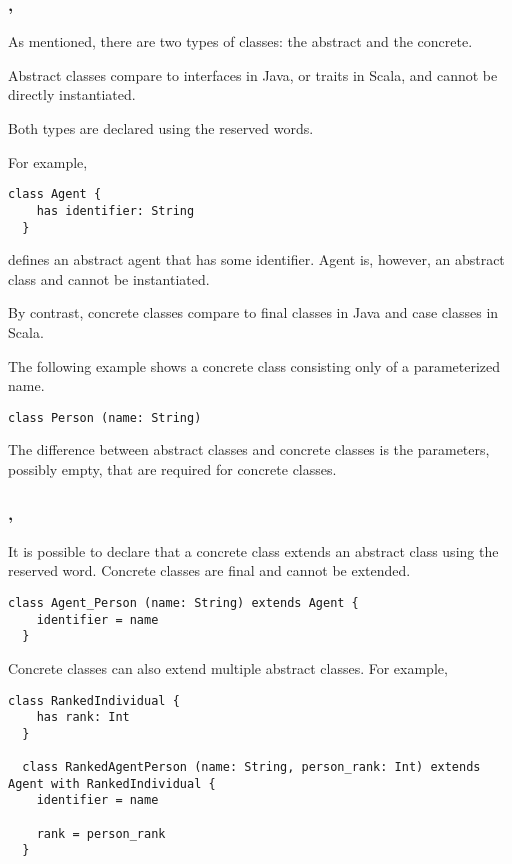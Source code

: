 \documentclass[12pt,a4paper]{book}
\begin{document}
    \subsubsection{\sclass, \shas}

    As mentioned, there are two types of classes: the abstract and the concrete.

    Abstract classes compare to interfaces in Java, or traits in Scala, and cannot be directly instantiated.

    Both types are declared using the \sclass reserved words.

    For example,
    \begin{lstlisting}[label={lst:exampleAbstractClass}]
  class Agent {
    has identifier: String
  }
    \end{lstlisting}
    defines an abstract agent that has some identifier.
    Agent is, however, an abstract class and cannot be instantiated.

    By contrast, concrete classes compare to final classes in Java and case classes in Scala.

    The following example shows a concrete class consisting only of a parameterized name.
    \begin{lstlisting}[label={lst:exampleConcreteClass}]
  class Person (name: String)
    \end{lstlisting}

    The difference between abstract classes and concrete classes is the parameters, possibly empty, that are required for concrete classes.

    \subsubsection{\sextends, \swith}

    It is possible to declare that a concrete class extends an abstract class using the \sextends reserved word.
    Concrete classes are final and cannot be extended.

    \begin{lstlisting}[label={lst:exampleExtends}]
  class Agent_Person (name: String) extends Agent {
    identifier = name
  }
    \end{lstlisting}

    Concrete classes can also extend multiple abstract classes.
    For example,
    \begin{lstlisting}[label={lst:exampleWith}]
  class RankedIndividual {
    has rank: Int
  }

  class RankedAgentPerson (name: String, person_rank: Int) extends Agent with RankedIndividual {
    identifier = name

    rank = person_rank
  }
    \end{lstlisting}
\end{document}
